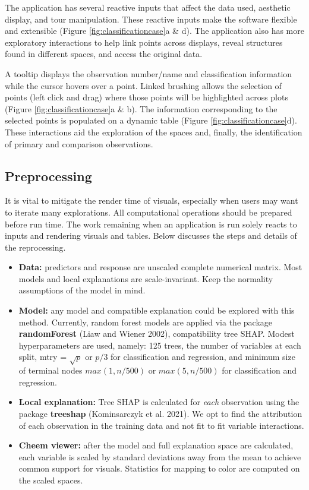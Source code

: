 \documentclass[
]{article}
\providecommand{\tightlist}{%
  \setlength{\itemsep}{0pt}\setlength{\parskip}{0pt}}
\begin{document}
The application has several reactive inputs that affect the data used, aesthetic display, and tour manipulation. These reactive inputs make the software flexible and extensible (Figure \ref{fig:classificationcase}a \& d). The application also has more exploratory interactions to help link points across displays, reveal structures found in different spaces, and access the original data.

A tooltip displays the observation number/name and classification information while the cursor hovers over a point. Linked brushing allows the selection of points (left click and drag) where those points will be highlighted across plots (Figure \ref{fig:classificationcase}a \& b). The information corresponding to the selected points is populated on a dynamic table (Figure \ref{fig:classificationcase}d). These interactions aid the exploration of the spaces and, finally, the identification of primary and comparison observations.

\hypertarget{preprocessing}{%
\subsection{Preprocessing}\label{preprocessing}}

It is vital to mitigate the render time of visuals, especially when users may want to iterate many explorations. All computational operations should be prepared before run time. The work remaining when an application is run solely reacts to inputs and rendering visuals and tables. Below discusses the steps and details of the reprocessing.

\begin{itemize}
\tightlist
\item
  \textbf{Data:} predictors and response are unscaled complete numerical matrix. Most models and local explanations are scale-invariant. Keep the normality assumptions of the model in mind.
\item
  \textbf{Model:} any model and compatible explanation could be explored with this method. Currently, random forest models are applied via the package \textbf{randomForest} (Liaw and Wiener 2002), compatibility tree SHAP. Modest hyperparameters are used, namely: 125 trees, the number of variables at each split, mtry = \(\sqrt{p}\) or \(p/3\) for classification and regression, and minimum size of terminal nodes \(max(1, n/500)\) or \(max(5, n/500)\) for classification and regression.
\item
  \textbf{Local explanation:} Tree SHAP is calculated for \emph{each} observation using the package \textbf{treeshap} (Kominsarczyk et al. 2021). We opt to find the attribution of each observation in the training data and not fit to fit variable interactions.
\item
  \textbf{Cheem viewer:} after the model and full explanation space are calculated, each variable is scaled by standard deviations away from the mean to achieve common support for visuals. Statistics for mapping to color are computed on the scaled spaces.
\end{itemize}
\end{document}
